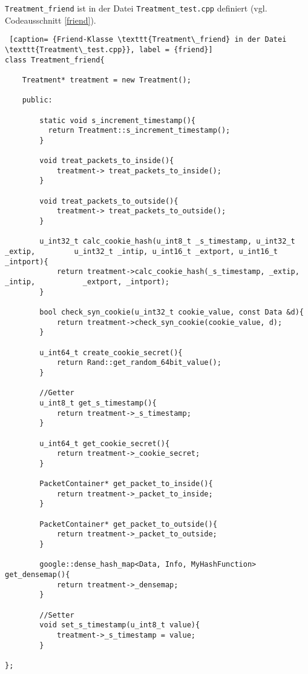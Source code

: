 \documentclass[../review_3.tex]{subfiles}
\begin{document}
\texttt{Treatment\_friend} ist in der Datei \texttt{Treatment\_test.cpp} definiert (vgl. Codeausschnitt \ref{friend}).

\begin{lstlisting} [caption= {Friend-Klasse \texttt{Treatment\_friend} in der Datei \texttt{Treatment\_test.cpp}}, label = {friend}]
class Treatment_friend{
    
    Treatment* treatment = new Treatment();
    
    public:
    
        static void s_increment_timestamp(){
          return Treatment::s_increment_timestamp();
        }
        
        void treat_packets_to_inside(){
            treatment-> treat_packets_to_inside();
        }
    
        void treat_packets_to_outside(){
            treatment-> treat_packets_to_outside();
        }
    
        u_int32_t calc_cookie_hash(u_int8_t _s_timestamp, u_int32_t _extip,         u_int32_t _intip, u_int16_t _extport, u_int16_t _intport){
            return treatment->calc_cookie_hash(_s_timestamp, _extip, _intip,           _extport, _intport);
        }
    
        bool check_syn_cookie(u_int32_t cookie_value, const Data &d){
            return treatment->check_syn_cookie(cookie_value, d);
        }
    
        u_int64_t create_cookie_secret(){
            return Rand::get_random_64bit_value();
        }

        //Getter
        u_int8_t get_s_timestamp(){
            return treatment->_s_timestamp;
        }

        u_int64_t get_cookie_secret(){
            return treatment->_cookie_secret;
        }

        PacketContainer* get_packet_to_inside(){
            return treatment->_packet_to_inside;
        }

        PacketContainer* get_packet_to_outside(){
            return treatment->_packet_to_outside;
        }
    
        google::dense_hash_map<Data, Info, MyHashFunction> get_densemap(){
            return treatment->_densemap;
        }

        //Setter
        void set_s_timestamp(u_int8_t value){
            treatment->_s_timestamp = value;
        }

};\end{lstlisting}
\end{document}
